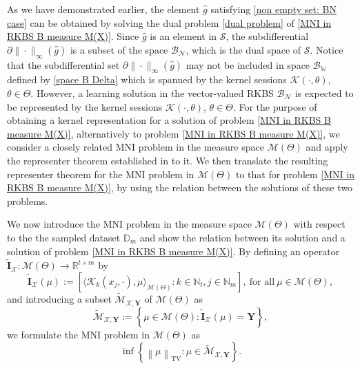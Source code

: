 \documentclass[11pt]{article}
\begin{document}
As we have demonstrated earlier, the element $\hat g$ satisfying \eqref{non empty set: BN case} can be obtained by solving the dual problem \eqref{dual problem} of \eqref{MNI in RKBS B measure M(X)}.
Since $\hat{g}$ is an element in $\mathcal{S}$, the subdifferential $\partial\|\cdot\|_\infty(\hat g)$ is a subset of the space $\mathcal{B}_{\mathcal{N}}$, which is the dual space of $\mathcal{S}$. Notice that the subdifferential set $\partial\|\cdot\|_\infty(\hat g)$ may not be included in space $\mathcal{B}_{\mathbb{W}}$  defined by \eqref{space B Delta} which is spanned by the kernel sessions $\mathcal{K}(\cdot,\theta)$, $\theta\in\Theta$.
However, a learning solution in the vector-valued RKBS $\mathcal{B}_{\mathcal{N}}$ is expected to be represented by the kernel sessions $\mathcal{K}(\cdot,\theta)$, $\theta\in\Theta$. For the purpose of obtaining a kernel representation for a solution of problem \eqref{MNI in RKBS B measure M(X)}, alternatively to problem \eqref{MNI in RKBS B measure M(X)}, we consider a closely related MNI problem in the measure space $\mathcal{M}(\Theta)$ and apply the representer theorem established in \cite{wang2023sparse} to it. We then translate the resulting representer theorem for the MNI problem in $\mathcal{M}(\Theta)$ to that for problem \eqref{MNI in RKBS B measure M(X)}, by using the relation between the solutions of these two problems.

We now introduce the MNI problem in the measure space $\mathcal{M}(\Theta)$ with respect to the the sampled dataset $\mathbb{D}_m$ and show the relation between its solution and a solution of problem \eqref{MNI in RKBS B measure M(X)}. By defining an operator $\widetilde{\mathbf{I}}_{\mathcal{X}}:\mathcal{M}(\Theta) \rightarrow \mathbb{R}^{t\times m}$ by
\begin{equation*}\label{tilde L on measure space}
\widetilde{\mathbf{I}}_{\mathcal{X}}(\mu):=\left[\langle \mathcal{K}_k(x_j,\cdot),\mu\rangle_{\mathcal{M}(\Theta)}: k\in\mathbb{N}_t, j \in \mathbb{N}_{m}\right],\ \mbox{for all}\ \mu\in\mathcal{M}(\Theta), 
\end{equation*} 
and introducing a subset $\widetilde{\mathcal{M}}_{\mathcal{X},\mathbf{Y}}$ of $\mathcal{M}(\Theta)$ as 
\begin{equation}\label{hyperplane in measure space}
    \widetilde{\mathcal{M}}_{\mathcal{X},\mathbf{Y}}:=\left\{\mu\in\mathcal{M}(\Theta):\widetilde{\mathbf{I}}_{\mathcal{X}}(\mu)=\mathbf{Y}\right\},
\end{equation}
we formulate the MNI problem in $\mathcal{M}(\Theta)$ as
\begin{equation}\label{MNI in measure space}
    \inf \left\{\left\|\mu\right\|_{\mathrm{TV}}: \mu \in \widetilde{\mathcal{M}}_{\mathcal{X},\mathbf{Y}}\right\}.
\end{equation}
\end{document}
